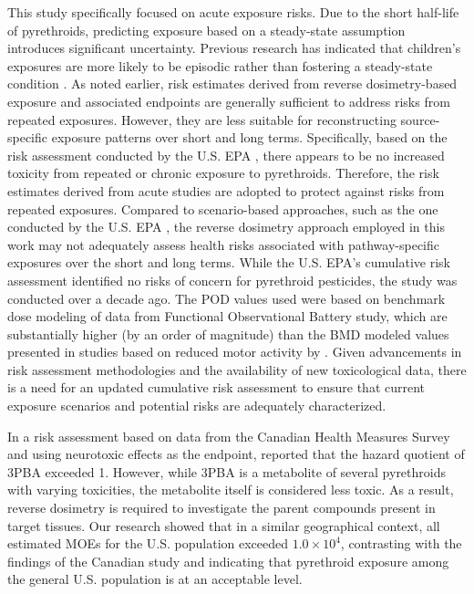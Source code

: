 \documentclass[toxics,article,submit,pdftex,moreauthors]{Definitions/mdpi}
\begin{document}
This study specifically focused on acute exposure risks. Due to the short
half-life of pyrethroids, predicting exposure based on a steady-state
assumption introduces significant uncertainty. Previous research has indicated
that children's exposures are more likely to be episodic rather than fostering
a steady-state condition \citep{kissel_comparison_2005}. As noted earlier, risk
estimates derived from reverse dosimetry-based exposure and associated
endpoints are generally sufficient to address risks from repeated exposures.
However, they are less suitable for reconstructing source-specific exposure
patterns over short and long terms. Specifically, based on the risk assessment
conducted by the U.S. EPA \citep{us2017cyfluthrin, us2017deltamethrin,
us2017permethrin, us2011pyrethroid, us2018cypermethrin}, there appears to be no
increased toxicity from repeated or chronic exposure to pyrethroids. Therefore,
the risk estimates derived from acute studies are adopted to protect against
risks from repeated exposures. Compared to scenario-based approaches, such as
the one conducted by the U.S. EPA \citep{us2011pyrethroid}, the reverse
dosimetry approach employed in this work may not adequately assess health risks
associated with pathway-specific exposures over the short and long terms. While
the U.S. EPA's cumulative risk assessment identified no risks of concern for
pyrethroid pesticides, the study was conducted over a decade ago. The POD
values used were based on benchmark dose modeling of data from Functional
Observational Battery study, which are substantially higher (by an order of
magnitude) than the BMD modeled values presented in studies based on reduced
motor activity by \citet{wolansky_relative_2006, wolansky_marcelo_j_evidence_2009}. Given advancements in risk
assessment methodologies and the availability of new toxicological data, there
is a need for an updated cumulative risk assessment to ensure that current
exposure scenarios and potential risks are adequately characterized.

In a risk assessment based on data from the Canadian Health Measures
Survey and using neurotoxic effects as the endpoint,
\citet{faure_evaluation_2020} reported that the hazard quotient of 3PBA
exceeded 1. However, while 3PBA is a metabolite of several pyrethroids
with varying toxicities, the metabolite itself is considered less toxic.
As a result, reverse dosimetry is required to investigate the parent
compounds present in target tissues. Our research showed that in a
similar geographical context, all estimated MOEs for the U.S. population
exceeded \(1.0 \times 10^{4}\), contrasting with the findings of the
Canadian study and indicating that pyrethroid exposure among the general
U.S. population is at an acceptable level.
\end{document}
